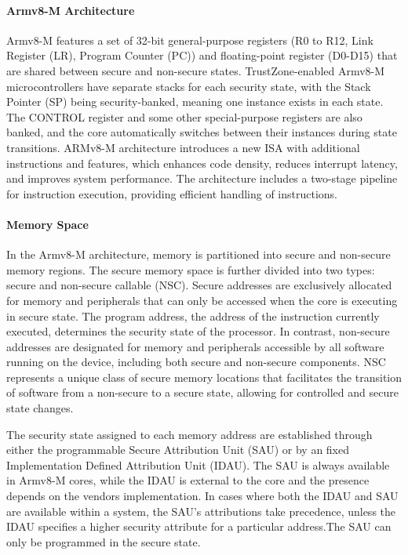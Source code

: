 \paragraph{\textbf{Armv8-M Architecture}} Armv8-M features a set of 32-bit
general-purpose registers (R0 to R12, Link Register (LR), Program Counter
(PC)) and floating-point register (D0-D15) that are shared between secure
and non-secure states. TrustZone-enabled Armv8-M microcontrollers have
separate stacks for each security state, with the Stack Pointer (SP) being
security-banked, meaning one instance exists in each state. The CONTROL
register and some other special-purpose registers are also banked, and the
core automatically switches between their instances during state
transitions. ARMv8-M architecture introduces a new ISA with additional
instructions and features, which enhances code density, reduces interrupt
latency, and improves system performance. The architecture includes a
two-stage pipeline for instruction execution, providing efficient handling
of instructions.

\paragraph{\textbf{Memory Space}} In the Armv8-M architecture, memory  is
partitioned into secure and non-secure memory regions. The secure memory
space is further divided into two types: secure and non-secure callable
(\ac{NSC}). Secure addresses are exclusively allocated for memory and
peripherals that can only be accessed when the core is executing in secure
state. The program address, the address of the instruction currently
executed, determines the security state of the processor. In contrast,
non-secure addresses are designated for memory and peripherals accessible
by all software running on the device, including both secure and non-secure
components. \ac{NSC} represents a unique class of secure memory locations
that facilitates the transition of software from a non-secure to a secure
state, allowing for controlled and secure state changes. 

The security state assigned to each memory address are established through
either the programmable Secure Attribution Unit (\ac{SAU}) or by an fixed
Implementation Defined Attribution Unit (\ac{IDAU}). The \ac{SAU} is always
available in Armv8-M cores, while the \ac{IDAU} is external to the core and
the presence depends on the vendors implementation. In cases where both the
\ac{IDAU} and \ac{SAU} are available within a system, the \ac{SAU}'s
attributions take precedence, unless the \ac{IDAU} specifies a higher
security attribute for a particular address.The \ac{SAU} can only be
programmed in the secure state. 


